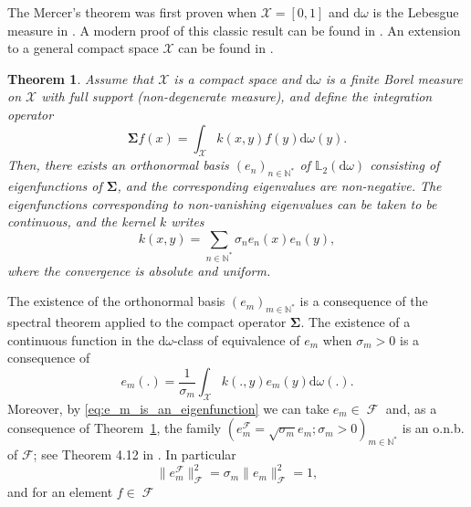 \documentclass[twoside,11pt]{book}
\newtheorem{theorem}{Theorem}
\numberwithin{theorem}{chapter}
\numberwithin{definition}{chapter}
\numberwithin{proposition}{chapter}
\numberwithin{corollary}{chapter}
\numberwithin{example}{chapter}
\numberwithin{lemma}{chapter}
\numberwithin{assumption}{chapter}
\DeclareMathOperator{\F}{\mathcal{F}}
\DeclareMathOperator{\X}{\mathcal{X}}
\begin{document}


The Mercer's theorem was first proven when $\mathcal{X} = [0,1]$ and $\mathrm{d}\omega$ is the Lebesgue measure in \cite{Mer1909}.
A modern proof of this classic result can be found in \cite{Lax02}. An extension to a general compact space $\mathcal{X}$ can be  found in \cite{CuZh07}. 


\begin{theorem}\label{thm:Mercer_for_compact}
Assume that $\mathcal{X}$ is a compact space and $\mathrm{d}\omega$ is a finite Borel measure on $\mathcal{X}$ with full support (non-degenerate measure), and define the integration operator
\begin{equation}
\bm{\Sigma} f(x) = \int_{\mathcal{X}} k(x,y)f(y) \mathrm{d}\omega(y).
\end{equation}
Then, there exists an orthonormal basis $(e_{n})_{n \in \mathbb{N}^{*}}$ of $\mathbb{L}_{2}(\mathrm{d}\omega)$ consisting of eigenfunctions of $\bm{\Sigma}$, and the corresponding eigenvalues are non-negative.
The eigenfunctions corresponding to non-vanishing eigenvalues can be taken to be continuous, and the kernel $k$ writes
\begin{equation}
k(x,y) = \sum\limits_{n \in \mathbb{N}^{*}} \sigma_{n} e_{n}(x)e_{n}(y),
\end{equation}
where the convergence is absolute and uniform.
\end{theorem}
The existence of the orthonormal basis $(e_m)_{m \in \mathbb{N}^{*}}$ is a consequence of the spectral theorem applied to the compact operator $\bm{\Sigma}$. The existence of a continuous function in the $\mathrm{d}\omega$-class of equivalence of $e_{m}$ when $\sigma_m>0$ is a consequence of
\begin{equation}\label{eq:e_m_is_an_eigenfunction}
e_{m}(.) = \frac{1}{\sigma_m} \int_{\X}k(.,y) e_{m}(y) \mathrm{d}\omega(.).
\end{equation}
Moreover, by \eqref{eq:e_m_is_an_eigenfunction} we can take $e_{m} \in \F$ and, as a consequence of Theorem~\ref{thm:Mercer_for_compact}, the family $(e_{m}^{\F} = \sqrt{\sigma_m}e_m; \sigma_m>0)_{m \in \mathbb{N}^{*}}$ is an o.n.b. of $\mathcal{F}$; see Theorem 4.12 in \cite{CuZh07}. In particular
\begin{equation}
\|e_{m}^{\F}\|_{\F}^{2} = \sigma_{m}\|e_{m}\|_{\F}^{2} = 1,
\end{equation}
and for an element $f \in \F$ 
\end{document}
